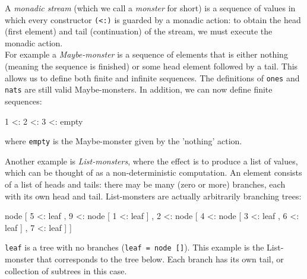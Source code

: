 A \emph{monadic stream} (which we call a \emph{monster} for short) is a sequence of values in which every constructor \verb+(<:)+ is guarded by a monadic action: to obtain the head (first element) and tail (continuation) of the stream, we must execute the monadic action. \\

For example a \emph{Maybe-monster} is a sequence of elements that is either nothing (meaning the sequence is finished) or some head element followed by a tail. This allows us to define both finite and infinite sequences. The definitions of \verb+ones+ and \verb+nats+ are still valid Maybe-monsters. In addition, we can now define finite sequences:
\begin{haskell}
  1 <: 2 <: 3 <: empty
\end{haskell}
where \verb+empty+ is the Maybe-monster given by the 'nothing' action. 

Another example is \emph{List-monsters}, where the effect is to produce a list of values, which can be thought of as a non-deterministic computation. An element consists of a list of heads and tails: there may be many (zero or more) branches, each with its own head and tail.
List-monsters are actually arbitrarily branching trees:
\begin{haskell}
node [ 5 <: leaf
     , 9 <: node [ 1 <: leaf
                 ]
     , 2 <: node [ 4 <: node [ 3 <: leaf
                             , 6 <: leaf
                             ]
                 , 7 <: leaf
                 ]
     ]
\end{haskell}
\verb+leaf+ is a tree with no branches (\verb+leaf = node []+). This example is the List-monster that corresponds to the tree below. Each branch has its own tail, or collection of subtrees in this case. \\

 \\

